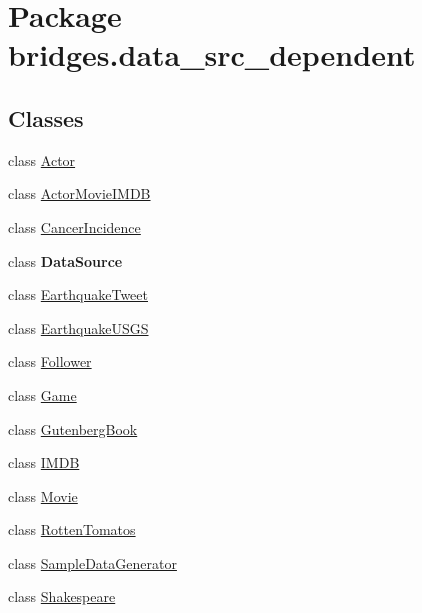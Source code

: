 \hypertarget{namespacebridges_1_1data__src__dependent}{}\section{Package bridges.\+data\+\_\+src\+\_\+dependent}
\label{namespacebridges_1_1data__src__dependent}
\subsection*{Classes}
\begin{DoxyCompactItemize}
\item 
class \mbox{\hyperlink{classbridges_1_1data__src__dependent_1_1_actor}{Actor}}
\item 
class \mbox{\hyperlink{classbridges_1_1data__src__dependent_1_1_actor_movie_i_m_d_b}{Actor\+Movie\+I\+M\+DB}}
\item 
class \mbox{\hyperlink{classbridges_1_1data__src__dependent_1_1_cancer_incidence}{Cancer\+Incidence}}
\item 
class {\bfseries Data\+Source}
\item 
class \mbox{\hyperlink{classbridges_1_1data__src__dependent_1_1_earthquake_tweet}{Earthquake\+Tweet}}
\item 
class \mbox{\hyperlink{classbridges_1_1data__src__dependent_1_1_earthquake_u_s_g_s}{Earthquake\+U\+S\+GS}}
\item 
class \mbox{\hyperlink{classbridges_1_1data__src__dependent_1_1_follower}{Follower}}
\item 
class \mbox{\hyperlink{classbridges_1_1data__src__dependent_1_1_game}{Game}}
\item 
class \mbox{\hyperlink{classbridges_1_1data__src__dependent_1_1_gutenberg_book}{Gutenberg\+Book}}
\item 
class \mbox{\hyperlink{classbridges_1_1data__src__dependent_1_1_i_m_d_b}{I\+M\+DB}}
\item 
class \mbox{\hyperlink{classbridges_1_1data__src__dependent_1_1_movie}{Movie}}
\item 
class \mbox{\hyperlink{classbridges_1_1data__src__dependent_1_1_rotten_tomatos}{Rotten\+Tomatos}}
\item 
class \mbox{\hyperlink{classbridges_1_1data__src__dependent_1_1_sample_data_generator}{Sample\+Data\+Generator}}
\item 
class \mbox{\hyperlink{classbridges_1_1data__src__dependent_1_1_shakespeare}{Shakespeare}}
\item 

\end{DoxyCompactItemize}
